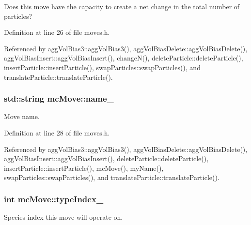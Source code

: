 Does this move have the capacity to create a net change in the total number of particles? 



Definition at line 26 of file moves.\-h.



Referenced by agg\-Vol\-Bias3\-::agg\-Vol\-Bias3(), agg\-Vol\-Bias\-Delete\-::agg\-Vol\-Bias\-Delete(), agg\-Vol\-Bias\-Insert\-::agg\-Vol\-Bias\-Insert(), change\-N(), delete\-Particle\-::delete\-Particle(), insert\-Particle\-::insert\-Particle(), swap\-Particles\-::swap\-Particles(), and translate\-Particle\-::translate\-Particle().

\hypertarget{classmc_move_ac18c307855e1cb5751bd6e079857a8c5}{
\subsubsection[{name\-\_\-}]{\setlength{\rightskip}{0pt plus 5cm}std\-::string mc\-Move\-::name\-\_\-\hspace{0.3cm}{\ttfamily [protected]}}}\label{classmc_move_ac18c307855e1cb5751bd6e079857a8c5}


Move name. 



Definition at line 28 of file moves.\-h.



Referenced by agg\-Vol\-Bias3\-::agg\-Vol\-Bias3(), agg\-Vol\-Bias\-Delete\-::agg\-Vol\-Bias\-Delete(), agg\-Vol\-Bias\-Insert\-::agg\-Vol\-Bias\-Insert(), delete\-Particle\-::delete\-Particle(), insert\-Particle\-::insert\-Particle(), mc\-Move(), my\-Name(), swap\-Particles\-::swap\-Particles(), and translate\-Particle\-::translate\-Particle().

\hypertarget{classmc_move_acb731965547b0326ef318ec96da8b46a}{
\subsubsection[{type\-Index\-\_\-}]{\setlength{\rightskip}{0pt plus 5cm}int mc\-Move\-::type\-Index\-\_\-\hspace{0.3cm}{\ttfamily [protected]}}}\label{classmc_move_acb731965547b0326ef318ec96da8b46a}


Species index this move will operate on. 



